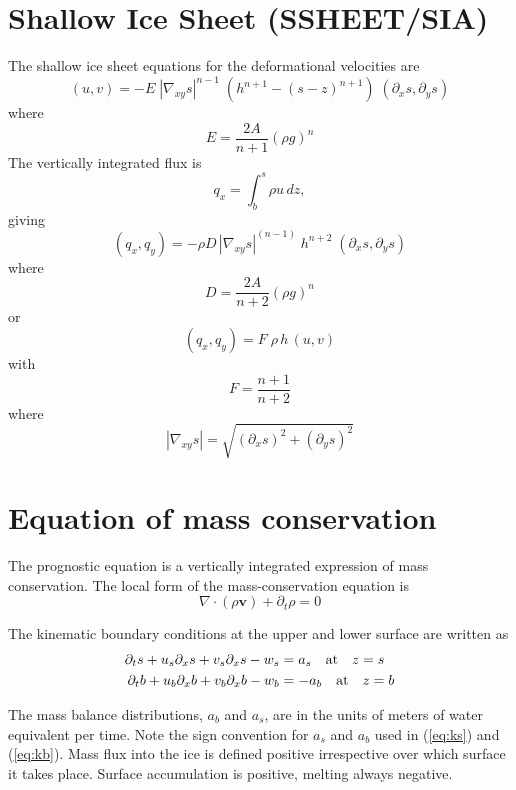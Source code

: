 \documentclass[10pt,a4paper]{book}
\newcommand{\p}{\partial}
\begin{document}
\section{Shallow Ice Sheet (SSHEET/SIA)}

The shallow ice sheet equations for the deformational velocities are
\[
(u,v)=-E \; |\nabla_{xy} s|^{n-1} \; \left (h^{n+1}-(s-z)^{n+1} \right ) \;(\p_x s,\p_y s)
\]
where
\[ 
E=\frac{2 A}{n+1}  (\rho g)^n 
\] 
The vertically integrated flux is
\[
q_x=\int_b^s \rho u \, dz ,
\]
giving
\[
(q_x,q_y)=-\rho D\,  |\nabla_{xy} s|^{(n-1)} \; h^{n+2} \; (\p_x s , \p_y s)
\]
where
\[
D=\frac{2 A }{n+2}  (\rho g)^n
\]
or
\[
(q_x,q_y)=F \; \rho \, h\,  (u,v)
\]
with
\[
F=\frac{n+1}{n+2}
\]
where
\[
|\nabla_{xy} s|=\sqrt{(\p_x s)^2+(\p_y s)^2}
\]





\section{Equation of mass conservation}

The prognostic equation is a vertically integrated expression of mass
conservation.  The local form of the mass-conservation equation is
\begin{equation}
\nabla \cdot (\rho \bm{v})+ \p_t \rho =0
\label{eq:mgen}
\end{equation}

The kinematic boundary conditions at the upper and lower surface are written as
\begin{align}
\p_t s + u_s \p_x s + v_s \p_x s - w_s &= a_s \quad \hbox{at} \quad z=s \label{eq:ks} \\
\p_t b + u_b \p_x b + v_b \p_x b - w_b &= -a_b \quad \hbox{at} \quad z=b \label{eq:kb}
\end{align}


The mass balance distributions, $a_b$ and $a_s$, are in the units of
meters of water equivalent per time. Note the sign convention for
$a_s$ and $a_b$ used in (\ref{eq:ks}) and (\ref{eq:kb}). Mass flux into
the ice is defined positive irrespective over which surface it takes
place. Surface accumulation is positive, melting always negative.
\end{document}
